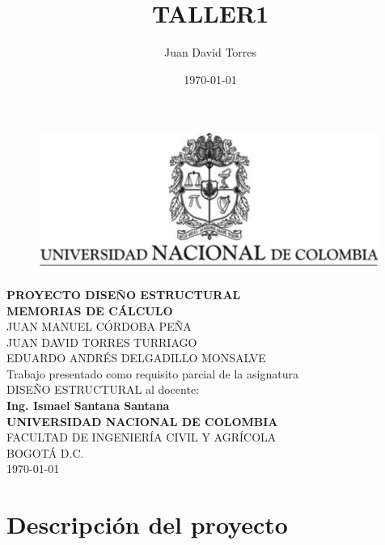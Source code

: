 \documentclass[12pt]{article}
\title{TALLER1}
\author{Juan David Torres}
\date{\today}
\begin{document}
\renewcommand{\tablename}{Tabla}%
\renewcommand{\listtablename}{Índice de tablas}
\begin{titlepage}
    \thispagestyle{empty}
    \begin{center}
        \begin{figure}
        \centering%
        \includegraphics{images/EscudoUN.png}
    \end{figure}
    
    \vspace{1cm}
    
        \textbf{PROYECTO DISEÑO ESTRUCTURAL\\MEMORIAS DE CÁLCULO}\\[1.3in]
      
    JUAN MANUEL CÓRDOBA PEÑA \\  
    JUAN DAVID TORRES TURRIAGO \\
    EDUARDO ANDRÉS DELGADILLO MONSALVE \\  [1.5in]
 Trabajo presentado como requisito parcial de la asignatura\\  DISEÑO ESTRUCTURAL  al docente:\\[3mm] \textbf {\large{Ing. Ismael Santana Santana}}\\[1.5in]
   \textbf{UNIVERSIDAD NACIONAL DE COLOMBIA}\\
   FACULTAD DE INGENIERÍA CIVIL Y AGRÍCOLA\\
   BOGOTÁ D.C.\\
   \today
    \end{center}
\end{titlepage}

\newpage
\thispagestyle{empty}
\tableofcontents
\thispagestyle{empty}
\newpage



\newpage

\setcounter{page}{1}
\section{Descripción del proyecto}
\end{document}
